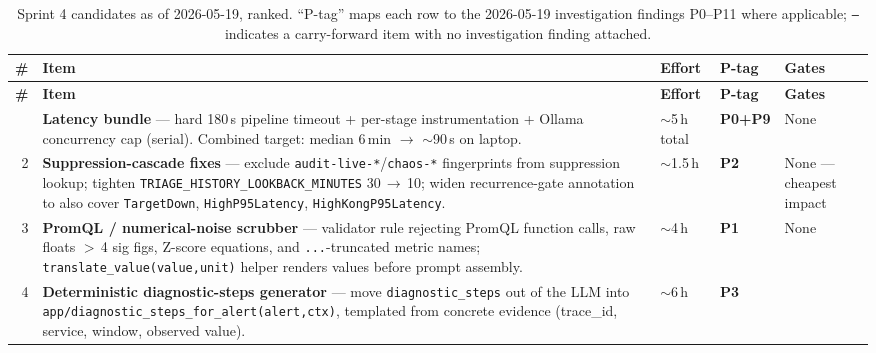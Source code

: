 \documentclass[11pt,a4paper,oneside]{report}
\begin{document}
\begin{longtable}{rp{} p{} p{} p{}}
\caption{Sprint 4 candidates as of 2026-05-19, ranked.  ``P-tag''
maps each row to the 2026-05-19 investigation findings P0--P11
where applicable; \texttt{---} indicates a carry-forward item with
no investigation finding attached.}
\label{tab:sprint4} \\
\toprule
\textbf{\#} & \textbf{Item} & \textbf{Effort} & \textbf{P-tag} & \textbf{Gates} \\
\midrule
\endfirsthead
\toprule
\textbf{\#} & \textbf{Item} & \textbf{Effort} & \textbf{P-tag} & \textbf{Gates} \\
\midrule
\endhead
\bottomrule
\endfoot
1 & \textbf{Latency bundle} --- hard 180\,s pipeline timeout +
    per-stage instrumentation + Ollama concurrency cap (serial).
    Combined target: median 6\,min $\to$ $\sim$90\,s on laptop.
                                              & $\sim$5\,h total
                                              & \textbf{P0+P9}
                                              & None \\
2 & \textbf{Suppression-cascade fixes} --- exclude
    \texttt{audit-live-*}/\texttt{chaos-*} fingerprints from
    suppression lookup; tighten
    \texttt{TRIAGE\_HISTORY\_LOOKBACK\_MINUTES} 30\,$\to$\,10;
    widen recurrence-gate annotation to also cover
    \texttt{TargetDown}, \texttt{HighP95Latency},
    \texttt{HighKongP95Latency}.
                                              & $\sim$1.5\,h
                                              & \textbf{P2}
                                              & None --- cheapest impact \\
3 & \textbf{PromQL / numerical-noise scrubber} --- validator rule
    rejecting PromQL function calls, raw floats $>$\,4 sig figs,
    Z-score equations, and \texttt{...}-truncated metric names;
    \texttt{translate\_value(value,unit)} helper renders values
    before prompt assembly.
                                              & $\sim$4\,h
                                              & \textbf{P1}
                                              & None \\
4 & \textbf{Deterministic diagnostic-steps generator} --- move
    \texttt{diagnostic\_steps} out of the LLM into
    \texttt{app/diagnostic\_steps\_for\_alert(alert,ctx)}, templated
    from concrete evidence (trace\_id, service, window, observed
    value).
                                              & $\sim$6\,h
                                              & \textbf{P3}

\end{longtable}
\end{document}
